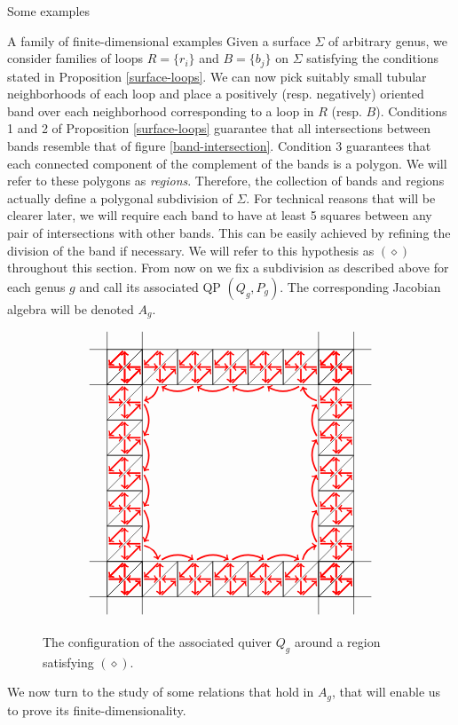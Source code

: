 \begin{chapter}{Some examples}
\begin{section}{A family of finite-dimensional examples}
Given a surface $\Sigma$ of arbitrary genus, we consider families of loops $R=\{r_i\}$ and $B=\{b_j\}$ on $\Sigma$ satisfying the conditions stated in Proposition \ref{surface-loops}. We can now pick suitably small tubular neighborhoods of each loop and place a positively (resp. negatively) oriented band over each neighborhood corresponding to a loop in $R$ (resp. $B$). Conditions 1 and 2 of Proposition \ref{surface-loops} guarantee that all intersections between bands resemble that of figure \ref{band-intersection}. Condition 3 guarantees that each connected component of the complement of the bands is a polygon. We will refer to these polygons as \emph{regions}. Therefore, the collection of bands and regions actually define a polygonal subdivision of $\Sigma$. For technical reasons that will be clearer later, we will require each band to have at least 5 squares between any pair of intersections with other bands. This can be easily achieved by refining the division of the band if necessary. We will refer to this hypothesis as $(\diamond)$ throughout this section. From now on we fix a subdivision as described above for each genus $g$ and call its associated QP $(Q_g,P_g)$. The corresponding Jacobian algebra will be denoted $A_g$.

\begin{figure}[h]
\[
\begin{tikzpicture}[scale=0.5]
\foreach \x in {-6,-4,...,6}
{
\ArrowedSquare{\x}{6}
\ArrowedSquare{\x}{-6}
\ArrowedSquare{6}{\x}
\ArrowedSquare{-6}{\x}
}
\draw (-8,-7) to (-7,-7);
\draw (-8,-5) to (-7,-5);
\draw (8,-7) to (7,-7);
\draw (8,-5) to (7,-5);
\draw (-8,7) to (-7,7);
\draw (-8,5) to (-7,5);
\draw (8,7) to (7,7);
\draw (8,5) to (7,5);
\draw (-7,-8) to (-7,-7);
\draw (-5,-8) to (-5,-7);
\draw (-7,8) to (-7,7);
\draw (-5,8) to (-5,7);
\draw (7,-8) to (7,-7);
\draw (5,-8) to (5,-7);
\draw (7,8) to (7,7);
\draw (5,8) to (5,7);
\foreach \x in {-4,-2,...,2}
{
\draw[<-, red, very thick] (-6+1.1, \x + 0.1) to [bend right] (-6+1.1, \x + 1.9);
\draw[->, red, very thick] (6-1.1, \x + 0.1) to [bend left] (6-1.1, \x + 1.9);
\draw[->, red, very thick] (\x + 0.1,-6+1.1) to [bend left] (\x + 1.9,-6+1.1);
\draw[<-, red, very thick] (\x + 0.1, 6-1.1) to [bend right] (\x + 1.9, 6-1.1);
}
\draw[->, red, very thick] (-4-0.1, 6-1.1) to [bend left] (-6+1.1, 4+0.1);
\draw[<-, red, very thick] (4+0.1, 6-1.1) to [bend right] (6-1.1, 4+0.1);
\draw[<-, red, very thick] (6-1.1, -4-0.1) to [bend right] (4+0.1, -6+1.1);
\draw[->, red, very thick] (-6+1.1, -4-0.1) to [bend left] (-4-0.1,-6+1.1);
\end{tikzpicture}
\]
\caption{The configuration of the associated quiver $Q_g$ around a region satisfying $(\diamond)$.}
\end{figure}
We now turn to the study of some relations that hold in $A_g$, that will enable us to prove its finite-dimensionality.


\end{section}
\end{chapter}
